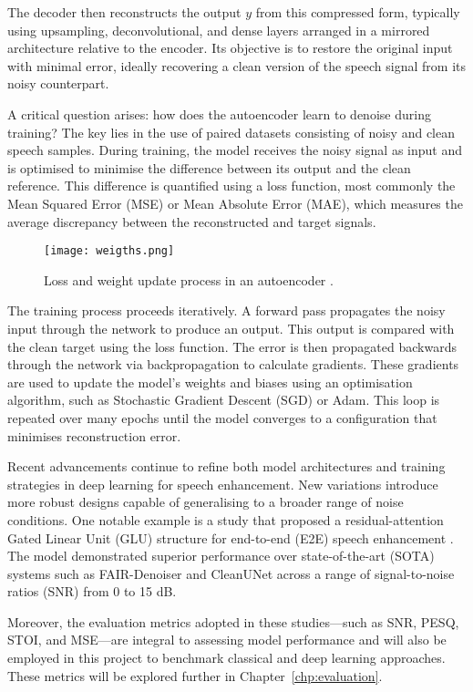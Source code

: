 The decoder then reconstructs the output \(y\) from this compressed form, typically using upsampling, deconvolutional, and dense layers arranged in a mirrored architecture relative to the encoder. Its objective is to restore the original input with minimal error, ideally recovering a clean version of the speech signal from its noisy counterpart.

A critical question arises: how does the autoencoder learn to denoise during training? The key lies in the use of paired datasets consisting of noisy and clean speech samples. During training, the model receives the noisy signal as input and is optimised to minimise the difference between its output and the clean reference. This difference is quantified using a loss function, most commonly the Mean Squared Error (MSE) or Mean Absolute Error (MAE), which measures the average discrepancy between the reconstructed and target signals.

\begin{figure}[h]
    \centering
    \texttt{[image: weigths.png]}
    \caption{\label{fig:weigths} Loss and weight update process in an autoencoder \cite{epoch2021}.}
\end{figure}

The training process proceeds iteratively. A forward pass propagates the noisy input through the network to produce an output. This output is compared with the clean target using the loss function. The error is then propagated backwards through the network via backpropagation to calculate gradients. These gradients are used to update the model’s weights and biases using an optimisation algorithm, such as Stochastic Gradient Descent (SGD) or Adam. This loop is repeated over many epochs until the model converges to a configuration that minimises reconstruction error.

Recent advancements continue to refine both model architectures and training strategies in deep learning for speech enhancement. New variations introduce more robust designs capable of generalising to a broader range of noise conditions. One notable example is a study that proposed a residual-attention Gated Linear Unit (GLU) structure for end-to-end (E2E) speech enhancement \cite{kim2024residual}. The model demonstrated superior performance over state-of-the-art (SOTA) systems such as FAIR-Denoiser and CleanUNet across a range of signal-to-noise ratios (SNR) from 0 to 15 dB.

Moreover, the evaluation metrics adopted in these studies—such as SNR, PESQ, STOI, and MSE—are integral to assessing model performance and will also be employed in this project to benchmark classical and deep learning approaches. These metrics will be explored further in Chapter~\ref{chp:evaluation}.
